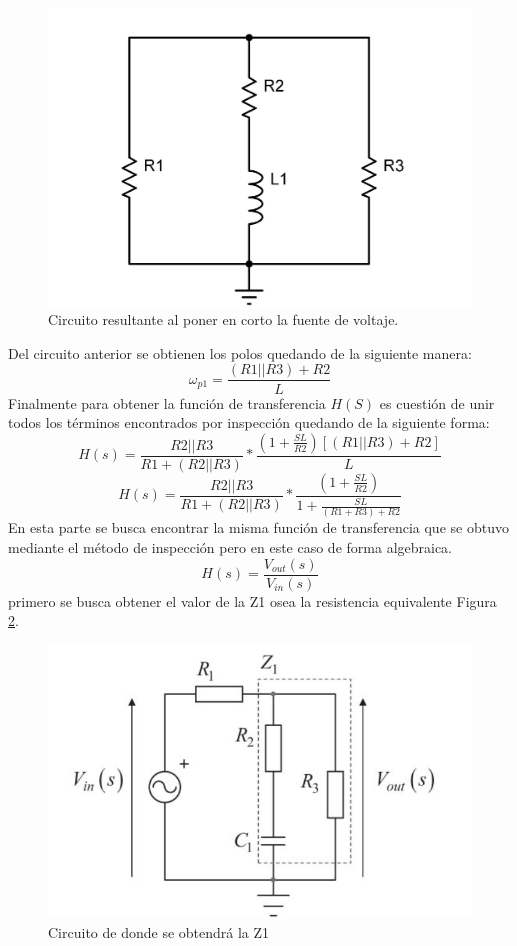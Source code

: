 \documentclass[letterpaper,10pt]{article}
\begin{document}
\begin{figure}[h!]
	\centering
	\includegraphics[width=0.5\linewidth]{esque_2}
	\caption{Circuito resultante al poner en corto la fuente de voltaje.}
	\label{fig:esque2}
\end{figure}
\FloatBarrier
Del circuito anterior se obtienen los polos quedando de la siguiente manera:
\[\omega_{p1}=\frac{(R1||R3)+R2}{L}\] 
Finalmente para obtener la función de transferencia $H(S)$ es cuestión de unir todos los términos encontrados por inspección quedando de la siguiente forma:
\[H(s)=\frac{R2||R3}{R1+(R2||R3)}*\frac{(1+\frac{SL}{R2})[(R1||R3)+R2]}{L}\]
\[H(s)=\frac{R2||R3}{R1+(R2||R3)}*\frac{(1+\frac{SL}{R2})}{1+\frac{SL}{(R1+R3)+R2}}\]
En esta parte se busca encontrar la misma función de transferencia que se obtuvo mediante el método de inspección pero en este caso de forma algebraica.
\[H(s)=\frac{V_{out}(s)}{V_{in}(s)}\] 
primero se busca obtener el valor de la Z1 osea la resistencia equivalente Figura \ref{fig:z1}.
\begin{figure}[h!]
	\centering
	\includegraphics[width=0.5\linewidth]{Z1}
	\caption{Circuito de donde se obtendrá la Z1}
	\label{fig:z1}
\end{figure}
\FloatBarrier
\end{document}
